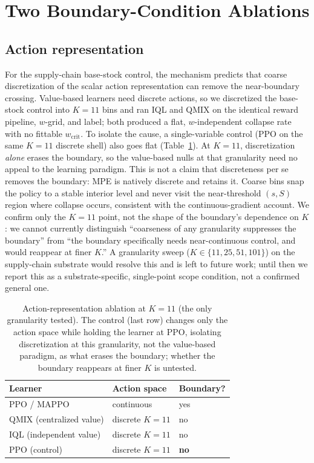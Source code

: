 \documentclass[letterpaper]{article} %
\theoremstyle{plain}
\newcommand{\wcrit}{w_{\mathrm{crit}}}
\begin{document}
\section{Two Boundary-Condition Ablations}
\label{sec:s_ablations}

\subsection{Action representation}
For the supply-chain base-stock control, the mechanism predicts that coarse discretization of the
scalar action representation can remove the near-boundary crossing.
Value-based learners need discrete actions, so we discretized the base-stock control into
$K{=}11$ bins and ran IQL and QMIX on the identical reward pipeline, $w$-grid, and label; both
produced a flat, $w$-independent collapse rate with no fittable $\wcrit$. To isolate the
cause, a single-variable control (PPO on the same $K{=}11$ discrete shell) also goes flat
(Table~\ref{tab:ablation_action}). At $K{=}11$, discretization \emph{alone} erases the boundary, so
the value-based nulls at that granularity need no appeal to the learning paradigm. This is not a
claim that discreteness per se removes the boundary: MPE is natively discrete and retains it. Coarse
bins snap the policy to a stable interior level and never visit the near-threshold $(s,S)$ region
where collapse occurs, consistent with the continuous-gradient account. We confirm only the $K{=}11$
point, not the shape of the boundary's dependence on $K$: we cannot currently distinguish
``coarseness of any granularity suppresses the boundary'' from ``the boundary specifically needs
near-continuous control, and would reappear at finer $K$.'' A granularity sweep
($K\in\{11,25,51,101\}$) on the supply-chain substrate would resolve this and is left to future work;
until then we report this as a substrate-specific, single-point scope condition, not a confirmed
general one.

\begin{table}[t]
\centering \small
\caption{Action-representation ablation at $K{=}11$ (the only granularity tested). The control
(last row) changes only the action space while holding the learner at PPO, isolating
discretization at this granularity, not the value-based paradigm, as what erases the boundary;
whether the boundary reappears at finer $K$ is untested.}
\label{tab:ablation_action}
\begin{tabular}{lll}
\toprule
Learner & Action space & Boundary? \\
\midrule
PPO / MAPPO & continuous & yes \\
QMIX (centralized value) & discrete $K{=}11$ & no \\
IQL (independent value) & discrete $K{=}11$ & no \\
PPO (control) & discrete $K{=}11$ & \textbf{no} \\
\bottomrule
\end{tabular}
\end{table}
\end{document}
